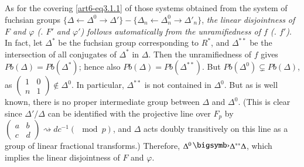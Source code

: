 \subsection{}\label{art6-subsec3.4}
As for the covering \eqref{art6-eq3.1.1} of those systems obtained from the system of fuchsian groups $\{\Delta \leftarrow \Delta^0 \rightarrow \Delta'\} - \{\Delta_n \leftarrow \Delta^0_n \rightarrow \Delta'_n\}$, \textit{the linear disjointness of $F$ and $\varphi$ (\resp. $F'$ and $\varphi'$) follows automatically from the unramifiedness of $f$ (\resp. $f'$)}. In fact, let $\Delta^\ast$ be the fuchsian group corresponding to $R^\ast$, and $\Delta^{\ast\ast}$ be the intersection of all conjugates of $\Delta^\ast$ in $\Delta$. Then the unramifiedness of $f$ gives $Pb (\Delta) = Pb (\Delta^\ast)$; hence also $Pb(\Delta) = Pb (\Delta^{\ast\ast})$. But $Pb(\Delta^0) \subsetneq Pb(\Delta)$, as $\begin{pmatrix}
1&0\\ n&1
\end{pmatrix} \not\in \Delta^0$. In particular, $\Delta^{\ast \ast}$ is not contained in $\Delta^0$. But as is well known, there is no proper intermediate group between $\Delta$ and $\Delta^0$. (This is clear since $\Delta' / \Delta$ can be identified with the projective line over $F_p$ by $\begin{pmatrix}
a & b \\c & d 
\end{pmatrix} \rightsquigarrow dc^{-1} (\mod p)$, and $\Delta$ acts doubly transitively on this line as a group of linear fractional transforms.) Therefore, $\Delta^0 \bigdot \Delta^{\ast\ast} \Delta$, which implies the linear disjointness of $F$ and $\varphi$.


